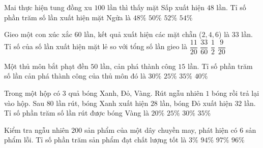 \begin{ex} %
Mai thực hiện tung đồng xu $100$ lần thì thấy mặt Sấp xuất hiện $48$ lần. Tỉ số phần trăm số lần xuất hiện mặt Ngửa là
\choice
{$48\%$}
{$50\%$}
{\True $52\%$}
{$54\%$}
\end{ex}

\begin{ex} %
Gieo một con xúc xắc $60$ lần, kết quả xuất hiện các mặt chẵn ($2, 4, 6$) là $33$ lần. Tỉ số của số lần xuất hiện mặt lẻ so với tổng số lần gieo là
\choice
{$\dfrac{11}{20}$}
{$\dfrac{33}{60}$}
{$\dfrac{1}{2}$}
{\True $\dfrac{9}{20}$}
\end{ex}

\begin{ex} %
Một thủ môn bắt phạt đền $50$ lần, cản phá thành công $15$ lần. Tỉ số phần trăm số lần cản phá thành công của thủ môn đó là
\choice
{\True $30\%$}
{$25\%$}
{$35\%$}
{$40\%$}
\end{ex}

\begin{ex} %
Trong một hộp có $3$ quả bóng Xanh, Đỏ, Vàng. Rút ngẫu nhiên $1$ bóng rồi trả lại vào hộp. Sau $80$ lần rút, bóng Xanh xuất hiện $28$ lần, bóng Đỏ xuất hiện $32$ lần. Tỉ số phần trăm số lần rút được bóng Vàng là
\choice
{$20\%$}
{\True $25\%$}
{$30\%$}
{$35\%$}
\end{ex}

\begin{ex} %
Kiểm tra ngẫu nhiên $200$ sản phẩm của một dây chuyền may, phát hiện có $6$ sản phẩm lỗi. Tỉ số phần trăm sản phẩm đạt chất lượng tốt là
\choice
{$3\%$}
{$94\%$}
{\True $97\%$}
{$96\%$}
\end{ex}

